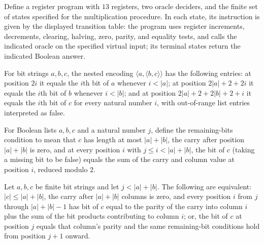 \begin{definition}
\label{Complexity.multARM}
\leanok
{}
Define a register program with $13$ registers, two oracle deciders, and the finite set
of states specified for the multiplication procedure. In each state, its instruction is
given by the displayed transition table: the program uses register increments,
decrements, clearing, halving, zero, parity, and equality tests, and calls the indicated
oracle on the specified virtual input; its terminal states return the indicated Boolean
answer.
\end{definition}

\begin{lemma}
\label{Complexity.mult_addresses}
\leanok
{}
For bit strings $a,b,c$, the nested encoding $\langle a,\langle b,c\rangle\rangle$ has
the following entries: at position $2i$ it equals the $i$th bit of $a$ whenever $i<|a|$;
at position $2|a|+2+2i$ it equals the $i$th bit of $b$ whenever $i<|b|$; and at position
$2|a|+2+2|b|+2+i$ it equals the $i$th bit of $c$ for every natural number $i$, with
out-of-range list entries interpreted as false.
\end{lemma}

\begin{definition}
\label{Complexity.MultRemaining}
\leanok
{}
For Boolean lists $a,b,c$ and a natural number $j$, define the remaining-bits condition
to mean that $c$ has length at most $|a|+|b|$, the carry after position $|a|+|b|$ is
zero, and at every position $i$ with $j\le i<|a|+|b|$, the bit of $c$ (taking a missing
bit to be false) equals the sum of the carry and column value at position $i$, reduced
modulo $2$.
\end{definition}

\begin{lemma}
\label{Complexity.mult_remaining_step}
\leanok
{}
Let $a,b,c$ be finite bit strings and let $j<|a|+|b|$. The following are equivalent:
$|c|\le |a|+|b|$, the carry after $|a|+|b|$ columns is zero, and every position $i$ from
$j$ through $|a|+|b|-1$ has bit of $c$ equal to the parity of the carry into column $i$
plus the sum of the bit products contributing to column $i$; or, the bit of $c$ at
position $j$ equals that column’s parity and the same remaining-bit conditions hold from
position $j+1$ onward.
\end{lemma}

